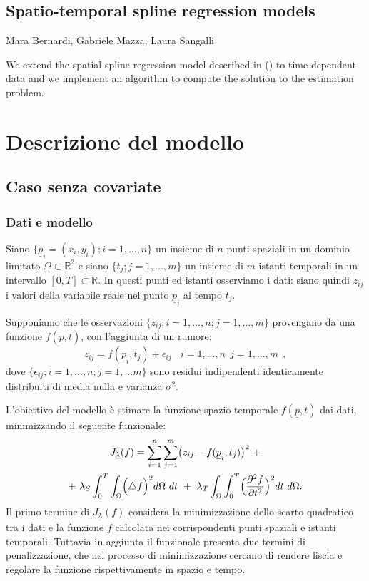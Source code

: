 \documentclass[a4paper,11pt,twoside,openright]{book}							%
\begin{document}
\begin{center} 
\section*{Spatio-temporal spline regression models}
Mara Bernardi, Gabriele Mazza, Laura Sangalli
\end{center}

We extend the spatial spline regression model described in (\cite{art:sangalli}) to time dependent data and we implement an algorithm to compute the solution to the estimation problem.


\chapter{Descrizione del modello}

\section{Caso senza covariate}

\subsection*{Dati e modello}

Siano $\{\underline p_i = (x_i,y_i); i=1, ... , n\}$ un insieme di $n$ punti spaziali in un dominio limitato $\Omega \subset \mathbb R^2$ e siano $\{t_j ; j=1, ... , m\}$ un insieme di $m$ istanti temporali in un intervallo $[0,T]\subset \mathbb R$. In questi punti ed istanti osserviamo i dati: siano quindi $z_{ij}$ i valori della variabile reale nel punto $\underline p_i$ al tempo $t_j$.

Supponiamo che le osservazioni $\{ z_{ij};i=1, ... , n; j=1, ... , m \}$ provengano da una funzione $f(\underline p, t)$, con l'aggiunta di un rumore:
\begin{equation}
\label{eq:modellobase}
z_{ij}=f(\underline p_i,t_j)+\epsilon_{ij}\ \ \ \ i = 1,...,n\ \ j=1,...,m \ \ ,
\end{equation}
dove $\{\epsilon_{ij}; i = 1,...,n; j=1,...m\}$ sono residui indipendenti identicamente distribuiti di media nulla e varianza $\sigma^2$.

L'obiettivo del modello è stimare la funzione spazio-temporale $f(\underline p, t)$ dai dati, minimizzando il seguente funzionale:
\begin{multline}
\label{eq:Jfunc}
J_{\underline \lambda }(f) = \sum_{i=1}^n \sum_{j=1}^m \bigl( z_{ij} - f(\underline p_i,t_j) \bigr)^2 \ + \\+\   \lambda_S \int_0^T \int_\Omega \Bigl( \triangle f  \Bigr)^2 d\Omega\ dt \ +\  \lambda_T \int_\Omega \int_0^T \Bigl( \frac{\partial^2 f }{\partial t ^2} \Bigr)^2 dt\ d\Omega .
\end{multline}
Il primo termine di $J_{\underline \lambda }(f)$ considera la minimizzazione dello scarto quadratico tra i dati e la funzione $f$ calcolata nei corrispondenti punti spaziali e istanti temporali. Tuttavia in aggiunta il funzionale presenta due termini di penalizzazione, che nel processo di minimizzazione cercano di rendere liscia e regolare la funzione rispettivamente in spazio e tempo.
\end{document}
